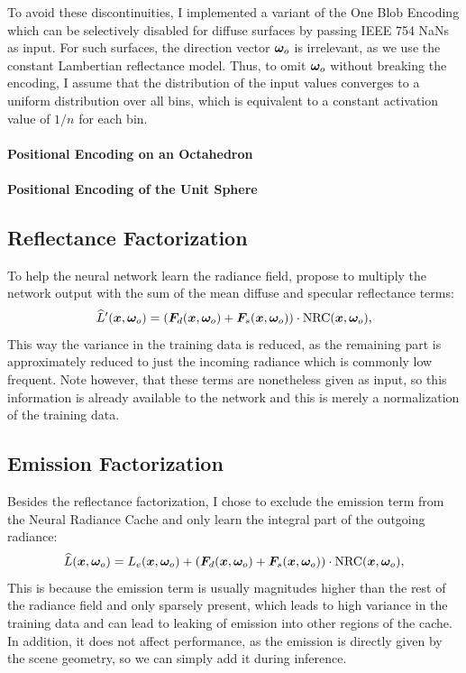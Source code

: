 To avoid these discontinuities, I implemented a variant of the One Blob Encoding which can be selectively disabled for diffuse surfaces by passing IEEE 754 NaNs as input.
For such surfaces, the direction vector ${\bm{\omega}_o}$ is irrelevant, as we use the constant Lambertian reflectance model.
Thus, to omit ${\bm{\omega}_o}$ without breaking the encoding, I assume that the distribution of the input values converges to a uniform distribution over all bins, which is equivalent to a constant activation value of $1 / n$ for each bin.

\paragraph{Positional Encoding on an Octahedron}

\paragraph{Positional Encoding of the Unit Sphere}

\subsection{Reflectance Factorization}
To help the neural network learn the radiance field, \textcite{muller2021} propose to multiply the network output with the sum of the mean diffuse and specular reflectance terms:
\begin{equation}
    \widehat{L}'(\vec{x}, \wo) = \left( \vec{F}_d(\vec{x}, \wo) + \vec{F}_s(\vec{x}, \wo) \right) \cdot \mathrm{NRC}(\vec{x}, \wo),
\end{equation}
This way the variance in the training data is reduced, as the remaining part is approximately reduced to just the incoming radiance which is commonly low frequent.
Note however, that these terms are nonetheless given as input, so this information is already available to the network and this is merely a normalization of the training data.

\subsection{Emission Factorization}
Besides the reflectance factorization, I chose to exclude the emission term from the Neural Radiance Cache and only learn the integral part of the outgoing radiance:
\begin{equation}
    \widehat{L}(\vec{x}, \wo) = L_e(\vec{x}, \wo) + \left( \vec{F}_d(\vec{x}, \wo) + \vec{F}_s(\vec{x}, \wo) \right) \cdot \mathrm{NRC}(\vec{x}, \wo),
\end{equation}
This is because the emission term is usually magnitudes higher than the rest of the radiance field and only sparsely present, which leads to high variance in the training data and can lead to leaking of emission into other regions of the cache.
In addition, it does not affect performance, as the emission is directly given by the scene geometry, so we can simply add it during inference.

